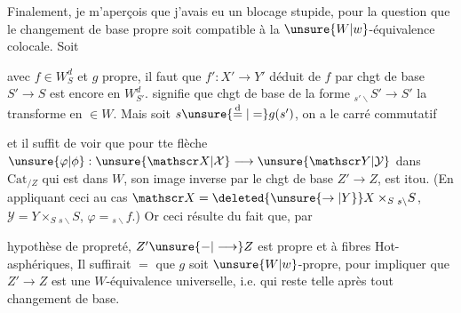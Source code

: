 

Finalement, je m'aperçois que j'avais eu un blocage stupide, pour la question que le changement de base propre soit compatible à la $\unsure{W|w}$-équivalence colocale. Soit


avec $f\in W_S^d$ et $g$ propre, il faut  que $f':X'\longrightarrow Y'$ déduit de $f$ par chgt de base $S'\longrightarrow S$ est encore en $W_{S'}^d$.  signifie que  chgt de base de la forme $ {}_{s'\backslash}S'\longrightarrow S'$ la transforme en  $\in W$. Mais soit $s\unsure{\overset{\mathrm d}{=}|=}g(s')$, on a le carré commutatif


 et il suffit de voir que pour tte flèche $\unsure{\varphi|\phi}:\unsure{\mathscr X|\mathcal X}\longrightarrow\unsure{\mathscr Y|\mathcal Y}$ dans $\mathrm{Cat}_{/Z}$ qui est dans $W$, son image inverse par le chgt de base $Z'\longrightarrow Z$, est itou. (En appliquant ceci au cas $\mathscr X=\deleted{\unsure{\rightarrow|Y}}X\times_S{}_{s\backslash}S$, $\mathscr Y=Y\times_S{}_{s\backslash}S$, $\varphi={}_{s\backslash}f$.) Or ceci résulte du fait que, par


hypothèse de propreté, $Z'\unsure{\mathord{-}|\longrightarrow}Z$ est propre et à fibres Hot-asphériques,  Il suffirait $=$ que $g$ soit $\unsure{W|w}$-propre, pour impliquer que $Z'\longrightarrow Z$ est une $W$-équivalence universelle, i.e. qui reste telle après tout changement de base.

